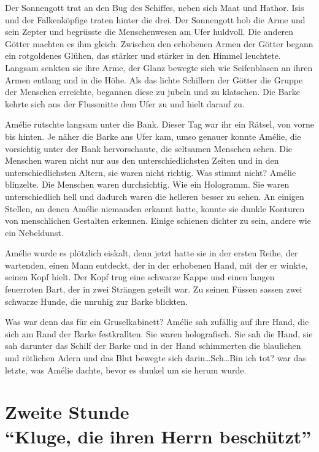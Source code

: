 \documentclass[11pt,titlepage,a5paper]{book}
\begin{document}
Der Sonnengott trat an den Bug des Schiffes, neben sich Maat und Hathor. Isis und der Falkenköpfige traten hinter die drei. Der Sonnengott hob die Arme und sein Zepter und begrüsste die Menschenwesen am Ufer huldvoll. Die anderen Götter machten es ihm gleich. Zwischen den erhobenen Armen der Götter begann ein rotgoldenes Glühen, das stärker und stärker in den Himmel leuchtete. Langsam senkten sie ihre Arme, der Glanz bewegte sich wie Seifenblasen an ihren Armen entlang und in die Höhe. Als das lichte Schillern der Götter die Gruppe der Menschen erreichte, begannen diese zu jubeln und zu klatschen. Die Barke kehrte sich aus der Flussmitte dem Ufer zu und hielt darauf zu. 

Amélie rutschte langsam unter die Bank. Dieser Tag war ihr ein Rätsel, von vorne bis hinten. Je näher die Barke ans Ufer kam, umso genauer konnte Amélie, die vorsichtig unter der Bank hervorschaute, die seltsamen Menschen sehen. Die Menschen waren nicht nur aus den unterschiedlichsten Zeiten und in den unterschiedlichsten Altern, sie waren nicht richtig. Was stimmt nicht? Amélie blinzelte. Die Menschen waren durchsichtig. Wie ein Hologramm. Sie waren unterschiedlich hell und dadurch waren die helleren besser zu sehen. An einigen Stellen, an denen Amélie niemanden erkannt hatte, konnte sie dunkle Konturen von menschlichen Gestalten erkennen. Einige schienen dichter zu sein, andere wie ein Nebeldunst.

Amélie wurde es plötzlich eiskalt, denn jetzt hatte sie in der ersten Reihe, der wartenden, einen Mann entdeckt, der in der erhobenen Hand, mit der er winkte, seinen Kopf hielt. Der Kopf trug eine schwarze Kappe und einen langen feuerroten Bart, der in zwei Strängen geteilt war. Zu seinen Füssen sassen zwei schwarze Hunde, die unruhig zur Barke blickten.

Was war denn das für ein Gruselkabinett? Amélie sah zufällig auf ihre Hand, die sich am Rand der Barke festkrallten. Sie waren holografisch. Sie sah die Hand, sie sah darunter das Schilf der Barke und in der Hand schimmerten die blaulichen und rötlichen Adern und das Blut bewegte sich darin\dots Sch\dots  Bin ich tot? war das letzte, was Amélie dachte, bevor es dunkel um sie herum wurde.   


\part*{Zweite Stunde\\"`Kluge, die ihren Herrn beschützt"'}
\end{document}
